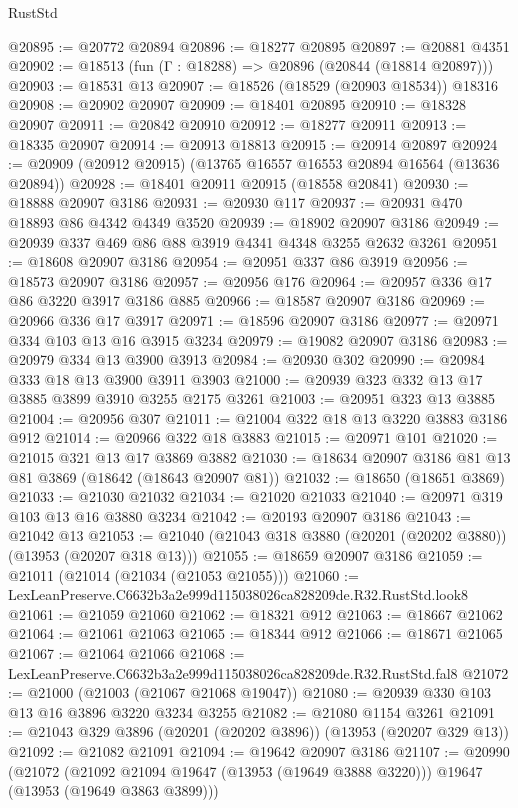 \begin{lexlean}{RustStd}
\begin{coremodule}
@20895 := @20772 @20894
@20896 := @18277 @20895
@20897 := @20881 @4351
@20902 := @18513 (fun (Γ : @18288) => @20896 (@20844 (@18814 @20897)))
@20903 := @18531 @13
@20907 := @18526 (@18529 (@20903 @18534)) @18316
@20908 := @20902 @20907
@20909 := @18401 @20895
@20910 := @18328 @20907
@20911 := @20842 @20910
@20912 := @18277 @20911
@20913 := @18335 @20907
@20914 := @20913 @18813
@20915 := @20914 @20897
@20924 := @20909 (@20912 @20915) (@13765 @16557 @16553 @20894 @16564 (@13636 @20894))
@20928 := @18401 @20911 @20915 (@18558 @20841)
@20930 := @18888 @20907 @3186
@20931 := @20930 @117
@20937 := @20931 @470 @18893 @86 @4342 @4349 @3520
@20939 := @18902 @20907 @3186
@20949 := @20939 @337 @469 @86 @88 @3919 @4341 @4348 @3255 @2632 @3261
@20951 := @18608 @20907 @3186
@20954 := @20951 @337 @86 @3919
@20956 := @18573 @20907 @3186
@20957 := @20956 @176
@20964 := @20957 @336 @17 @86 @3220 @3917 @3186 @885
@20966 := @18587 @20907 @3186
@20969 := @20966 @336 @17 @3917
@20971 := @18596 @20907 @3186
@20977 := @20971 @334 @103 @13 @16 @3915 @3234
@20979 := @19082 @20907 @3186
@20983 := @20979 @334 @13 @3900 @3913
@20984 := @20930 @302
@20990 := @20984 @333 @18 @13 @3900 @3911 @3903
@21000 := @20939 @323 @332 @13 @17 @3885 @3899 @3910 @3255 @2175 @3261
@21003 := @20951 @323 @13 @3885
@21004 := @20956 @307
@21011 := @21004 @322 @18 @13 @3220 @3883 @3186 @912
@21014 := @20966 @322 @18 @3883
@21015 := @20971 @101
@21020 := @21015 @321 @13 @17 @3869 @3882
@21030 := @18634 @20907 @3186 @81 @13 @81 @3869 (@18642 (@18643 @20907 @81))
@21032 := @18650 (@18651 @3869)
@21033 := @21030 @21032
@21034 := @21020 @21033
@21040 := @20971 @319 @103 @13 @16 @3880 @3234
@21042 := @20193 @20907 @3186
@21043 := @21042 @13
@21053 := @21040 (@21043 @318 @3880 (@20201 (@20202 @3880)) (@13953 (@20207 @318 @13)))
@21055 := @18659 @20907 @3186
@21059 := @21011 (@21014 (@21034 (@21053 @21055)))
@21060 := LexLeanPreserve.C6632b3a2e999d115038026ca828209de.R32.RustStd.look8
@21061 := @21059 @21060
@21062 := @18321 @912
@21063 := @18667 @21062
@21064 := @21061 @21063
@21065 := @18344 @912
@21066 := @18671 @21065
@21067 := @21064 @21066
@21068 := LexLeanPreserve.C6632b3a2e999d115038026ca828209de.R32.RustStd.fal8
@21072 := @21000 (@21003 (@21067 @21068 @19047))
@21080 := @20939 @330 @103 @13 @16 @3896 @3220 @3234 @3255
@21082 := @21080 @1154 @3261
@21091 := @21043 @329 @3896 (@20201 (@20202 @3896)) (@13953 (@20207 @329 @13))
@21092 := @21082 @21091
@21094 := @19642 @20907 @3186
@21107 := @20990
    (@21072
      (@21092 @21094 @19647 (@13953 (@19649 @3888 @3220)))
      @19647
      (@13953 (@19649 @3863 @3899)))

\end{coremodule}
\end{lexlean}
